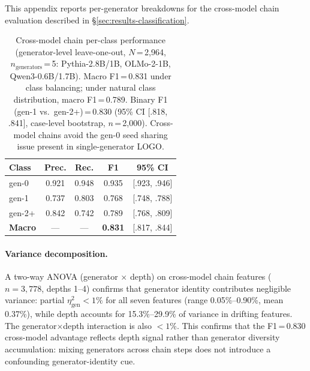This appendix reports per-generator breakdowns for the cross-model chain evaluation described in \S\ref{sec:results-classification}.

\begin{table}[ht]
\centering
\footnotesize
\caption{Cross-model chain per-class performance (generator-level leave-one-out, $N$\,=\,2{,}964, $n_{\text{generators}}$\,=\,5: Pythia-2.8B/1B, OLMo-2-1B, Qwen3-0.6B/1.7B). Macro F1\,=\,0.831 under class balancing; under natural class distribution, macro F1\,=\,0.789. Binary F1 (gen-1 vs.\ gen-2+)\,=\,0.830 (95\% CI [.818, .841], case-level bootstrap, $n$\,=\,2{,}000). Cross-model chains avoid the gen-0 seed sharing issue present in single-generator LOGO.}
\label{tab:cross-model-perclass}
\begin{tabular}{lcccc}
\toprule
\textbf{Class} & \textbf{Prec.} & \textbf{Rec.} & \textbf{F1} & \textbf{95\% CI} \\
\midrule
gen-0   & 0.921 & 0.948 & 0.935 & [.923, .946] \\
gen-1   & 0.737 & 0.803 & 0.768 & [.748, .788] \\
gen-2+  & 0.842 & 0.742 & 0.789 & [.768, .809] \\
\midrule
\textbf{Macro} & --- & --- & \textbf{0.831} & [.817, .844] \\
\bottomrule
\end{tabular}
\end{table}

\paragraph{Variance decomposition.}
A two-way ANOVA (generator $\times$ depth) on cross-model chain features ($n{=}3{,}778$, depths 1--4) confirms that generator identity contributes negligible variance: partial $\eta^2_{\text{gen}} < 1\%$ for all seven features (range 0.05\%--0.90\%, mean 0.37\%), while depth accounts for 15.3\%--29.9\% of variance in drifting features.
The generator$\times$depth interaction is also $< 1\%$.
This confirms that the F1\,=\,0.830 cross-model advantage reflects depth signal rather than generator diversity accumulation: mixing generators across chain steps does not introduce a confounding generator-identity cue.
